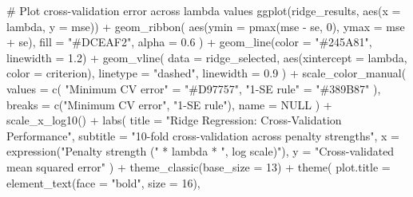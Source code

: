 \documentclass[
  letterpaper,
  DIV=11,
  numbers=noendperiod]{scrreprt}
\newenvironment{Shaded}{\begin{snugshade}}{\end{snugshade}}
\newcommand{\AttributeTok}[1]{\textcolor[rgb]{0.40,0.45,0.13}{#1}}
\newcommand{\CommentTok}[1]{\textcolor[rgb]{0.37,0.37,0.37}{#1}}
\newcommand{\ConstantTok}[1]{\textcolor[rgb]{0.56,0.35,0.01}{#1}}
\newcommand{\DecValTok}[1]{\textcolor[rgb]{0.68,0.00,0.00}{#1}}
\newcommand{\FloatTok}[1]{\textcolor[rgb]{0.68,0.00,0.00}{#1}}
\newcommand{\FunctionTok}[1]{\textcolor[rgb]{0.28,0.35,0.67}{#1}}
\newcommand{\NormalTok}[1]{\textcolor[rgb]{0.00,0.23,0.31}{#1}}
\newcommand{\OtherTok}[1]{\textcolor[rgb]{0.00,0.23,0.31}{#1}}
\newcommand{\SpecialCharTok}[1]{\textcolor[rgb]{0.37,0.37,0.37}{#1}}
\newcommand{\StringTok}[1]{\textcolor[rgb]{0.13,0.47,0.30}{#1}}
\begin{document}
\begin{Shaded}
\begin{Highlighting}[]
\CommentTok{\# Plot cross{-}validation error across lambda values}
\FunctionTok{ggplot}\NormalTok{(ridge\_results, }\FunctionTok{aes}\NormalTok{(}\AttributeTok{x =}\NormalTok{ lambda, }\AttributeTok{y =}\NormalTok{ mse)) }\SpecialCharTok{+}
  \FunctionTok{geom\_ribbon}\NormalTok{(}
    \FunctionTok{aes}\NormalTok{(}\AttributeTok{ymin =} \FunctionTok{pmax}\NormalTok{(mse }\SpecialCharTok{{-}}\NormalTok{ se, }\DecValTok{0}\NormalTok{), }\AttributeTok{ymax =}\NormalTok{ mse }\SpecialCharTok{+}\NormalTok{ se),}
    \AttributeTok{fill =} \StringTok{"\#DCEAF2"}\NormalTok{, }\AttributeTok{alpha =} \FloatTok{0.6}
\NormalTok{  ) }\SpecialCharTok{+}
  \FunctionTok{geom\_line}\NormalTok{(}\AttributeTok{color =} \StringTok{"\#245A81"}\NormalTok{, }\AttributeTok{linewidth =} \FloatTok{1.2}\NormalTok{) }\SpecialCharTok{+}
  \FunctionTok{geom\_vline}\NormalTok{(}
    \AttributeTok{data =}\NormalTok{ ridge\_selected,}
    \FunctionTok{aes}\NormalTok{(}\AttributeTok{xintercept =}\NormalTok{ lambda, }\AttributeTok{color =}\NormalTok{ criterion),}
    \AttributeTok{linetype =} \StringTok{"dashed"}\NormalTok{, }\AttributeTok{linewidth =} \FloatTok{0.9}
\NormalTok{  ) }\SpecialCharTok{+}
  \FunctionTok{scale\_color\_manual}\NormalTok{(}
    \AttributeTok{values =} \FunctionTok{c}\NormalTok{(}
      \StringTok{"Minimum CV error"} \OtherTok{=} \StringTok{"\#D97757"}\NormalTok{,}
      \StringTok{"1{-}SE rule"} \OtherTok{=} \StringTok{"\#389B87"}
\NormalTok{    ),}
    \AttributeTok{breaks =} \FunctionTok{c}\NormalTok{(}\StringTok{"Minimum CV error"}\NormalTok{, }\StringTok{"1{-}SE rule"}\NormalTok{),}
    \AttributeTok{name =} \ConstantTok{NULL}
\NormalTok{  ) }\SpecialCharTok{+}
  \FunctionTok{scale\_x\_log10}\NormalTok{() }\SpecialCharTok{+}
  \FunctionTok{labs}\NormalTok{(}
    \AttributeTok{title =} \StringTok{"Ridge Regression: Cross{-}Validation Performance"}\NormalTok{,}
    \AttributeTok{subtitle =} \StringTok{"10{-}fold cross{-}validation across penalty strengths"}\NormalTok{,}
    \AttributeTok{x =} \FunctionTok{expression}\NormalTok{(}\StringTok{"Penalty strength ("} \SpecialCharTok{*}\NormalTok{ lambda }\SpecialCharTok{*} \StringTok{", log scale)"}\NormalTok{),}
    \AttributeTok{y =} \StringTok{"Cross{-}validated mean squared error"}
\NormalTok{  ) }\SpecialCharTok{+}
  \FunctionTok{theme\_classic}\NormalTok{(}\AttributeTok{base\_size =} \DecValTok{13}\NormalTok{) }\SpecialCharTok{+}
  \FunctionTok{theme}\NormalTok{(}
    \AttributeTok{plot.title =} \FunctionTok{element\_text}\NormalTok{(}\AttributeTok{face =} \StringTok{"bold"}\NormalTok{, }\AttributeTok{size =} \DecValTok{16}\NormalTok{),}

\end{Highlighting}
\end{Shaded}
\end{document}
